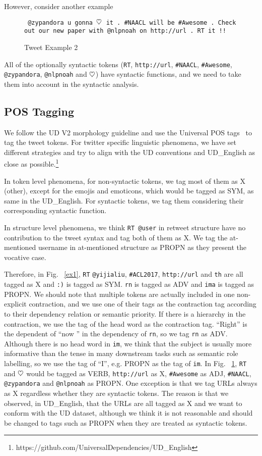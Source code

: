 \documentclass[11pt,letterpaper]{article}
\newcommand{\heart}{\ensuremath\heartsuit}
\begin{document}
However, consider another example
\begin{figure}[h]
\small
{\tt
@zypandora u gonna $\heart$ it . \#NAACL will be \#Awesome . Check out our new paper with @nlpnoah on http://url . RT it !!
}
\caption{Tweet Example 2}
\label{ex2}
\end{figure}

All of the optionally syntactic tokens ({\tt RT}, {\tt http://url}, {\tt \#NAACL}, {\tt \#Awesome}, {\tt @zypandora}, {\tt @nlpnoah} and {\tt $\heart$}) have syntactic functions, and we need to take them into account in the syntactic analysis.



\subsection{POS Tagging}
We follow the UD V2 morphology guideline and use the Universal POS tags~\cite{PETROV12.274} to tag the tweet tokens. For twitter specific linguistic phenomena, we have set different strategies and try to align with the UD conventions and UD\_English as close as possible.\footnote{https://github.com/UniversalDependencies/UD\_English}

In token level phenomena, for non-syntactic tokens, we tag most of them as X (other), except for the emojis and emoticons, which would be tagged as SYM, as same in the UD\_English. 
For syntactic tokens, we tag them considering their corresponding syntactic function.

In structure level phenomena, we think {\tt RT @user} in retweet structure have no contribution to the tweet syntax and tag both of them as X.
We tag the at-mentioned username in at-mentioned structure as PROPN as they present the vocative case.

Therefore, in Fig. ~\ref{ex1}, {\tt RT} {\tt @yijialiu}, {\tt \#ACL2017}, {\tt http://url} and {\tt th} are all tagged as X and {\tt :)} is tagged as SYM. 
{\tt rn} is tagged as ADV and {\tt ima} is tagged as PROPN.
We should note that multiple tokens are actually included in one non-explicit contraction, and we use one of their tags as the contraction tag according to their dependency relation or semantic priority.
If there is a hierarchy in the contraction, we use the tag of the head word as the contraction tag. ``Right'' is the dependent of ``now '' in the dependency of {\tt rn}, so we tag {\tt rn} as ADV. Although there is no head word in {\tt im}, we think that the subject is usually more informative than the tense in many downstream tasks such as semantic role labelling, so we use the tag of ``I'', e.g. PROPN as the tag of {\tt im}.  
In Fig. ~\ref{ex2}, {\tt RT} and {\tt $\heart$} would be tagged as VERB, {\tt http://url} as X, {\tt \#Awesome} as ADJ, {\tt \#NAACL}, {\tt @zypandora} and {\tt @nlpnoah} as PROPN. One exception is that we tag URLs always as X regardless whether they are syntactic tokens. The reason is that we observed, in UD\_English, that the URLs are all tagged as X and we want to conform with the UD dataset, although we think it is not reasonable and should be changed to tags such as PROPN when they are treated as syntactic tokens.
\end{document}

